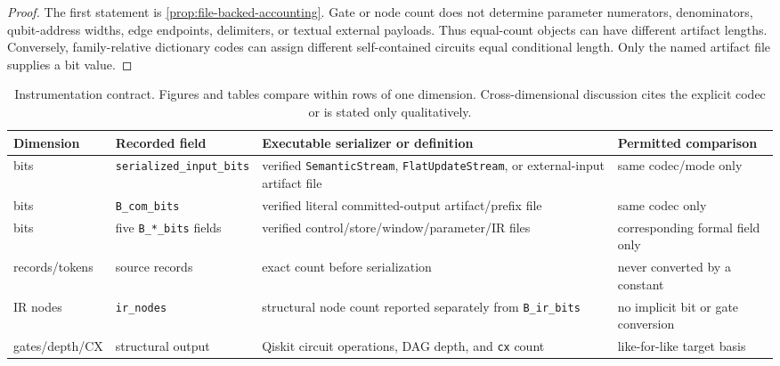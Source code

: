\documentclass[a4paper,twocolumn,10pt,unpublished]{quantumarticle}
\begin{document}
\begin{proof}
The first statement is \cref{prop:file-backed-accounting}.  Gate or node count
does not determine parameter numerators, denominators, qubit-address widths,
edge endpoints, delimiters, or textual external payloads.  Thus equal-count
objects can have different artifact lengths.  Conversely, family-relative
dictionary codes can assign different self-contained circuits equal
conditional length.  Only the named artifact file supplies a bit value.
\end{proof}

\begin{table}[!t]
\centering
\scriptsize
\setlength{\tabcolsep}{3pt}
\begin{tabularx}{\textwidth}{@{}l l X X@{}}
\toprule
Dimension & Recorded field & Executable serializer or definition & Permitted comparison \\
\midrule
bits & \texttt{serialized\_input\_bits} & verified \texttt{SemanticStream}, \texttt{FlatUpdateStream}, or external-input artifact file & same codec/mode only \\
bits & \texttt{B\_com\_bits} & verified literal committed-output artifact/prefix file & same codec only \\
bits & five \texttt{B\_*\_bits} fields & verified control/store/window/parameter/IR files & corresponding formal field only \\
records/tokens & source records & exact count before serialization & never converted by a constant \\
IR nodes & \texttt{ir\_nodes} & structural node count reported separately from \texttt{B\_ir\_bits} & no implicit bit or gate conversion \\
gates/depth/CX & structural output & Qiskit circuit operations, DAG depth, and \texttt{cx} count & like-for-like target basis \\
\bottomrule
\end{tabularx}
\caption{Instrumentation contract.  Figures and tables compare within rows of
one dimension.  Cross-dimensional discussion cites the explicit codec or is
stated only qualitatively.}
\label{tab:instrumentation-contract}
\end{table}
\end{document}
